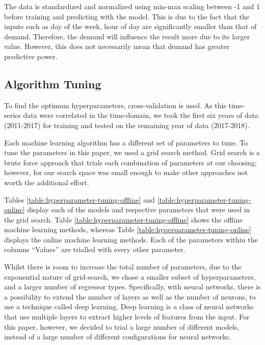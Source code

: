 \documentclass[final,3p,times,twocolumn,numbers]{elsarticle}
\begin{document}
The data is standardized and normalized using min-max scaling between -1 and 1 before training and predicting with the model. This is due to the fact that the inputs such as day of the week, hour of day are significantly smaller than that of demand. Therefore, the demand will influence the result  more due to its larger value. However, this does not necessarily mean that demand has greater predictive power.

\subsection{Algorithm Tuning}

To find the optimum hyperparameters, cross-validation is used. As this time-series data were correlated in the time-domain, we took the first six years of data (2011-2017) for training and tested on the remaining year of data (2017-2018).

Each machine learning algorithm has a different set of parameters to tune. To tune the parameters in this paper, we used a grid search method. Grid search is a brute force approach that trials each combination of parameters at our choosing; however, for our search space was small enough to make other approaches not worth the additional effort.

Tables \ref{table:hyperparameter-tuning-offline} and \ref{table:hyperparameter-tuning-online} display each of the models and respective parameters that were used in the grid search. Table \ref{table:hyperparameter-tuning-offline} shows the offline machine learning methods, whereas Table \ref{table:hyperparameter-tuning-online} displays the online machine learning methods. Each of the parameters within the columns ``Values'' are trialled with every other parameter.

Whilst there is room to increase the total number of parameters, due to the exponential nature of grid-search, we chose a smaller subset of hyperparameters, and a larger number of regressor types. Specifically, with neural networks, there is a possibility to extend the number of layers as well as the number of neurons, to use a technique called deep learning. Deep learning is a class of neural networks that use multiple layers to extract higher levels of features from the input. For this paper, however, we decided to trial a large number of different models, instead of a large number of different configurations for neural networks.
\end{document}
